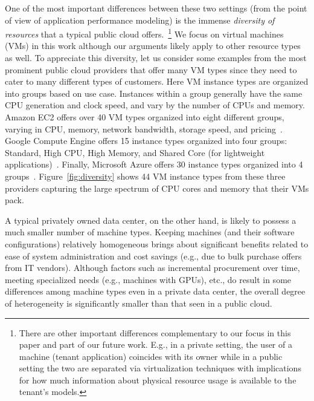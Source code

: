 One of the most important differences between  these two settings (from the point of view of application performance modeling) is the immense {\it diversity of resources} that a typical public cloud offers.~\footnote{There are other important differences complementary to our focus in this paper and part of our future work. E.g., in a private setting, the user of a machine (tenant application) coincides with its owner while in a public setting the two are separated via virtualization techniques with implications for how much information about physical resource usage is available to the tenant's models. } We focus on virtual machines (VMs) %
in this work although our arguments likely apply to other resource types as well. To appreciate this diversity, let us consider some examples from the most prominent public cloud providers that offer many VM types since they need to cater to many different types of customers. Here VM instance types are organized into groups based on use case.  Instances within a group generally have the same CPU generation and clock speed, and vary by the number of CPUs and memory.  Amazon EC2 offers over 40 VM types organized into eight different groups, varying in CPU, memory, network bandwidth, storage speed, and pricing~\cite{amazon-ec2}. Google Compute Engine offers 15 instance types organized into four groups: Standard, High CPU, High Memory, and Shared Core (for lightweight applications)~\cite{google-computeengine}. Finally, Microsoft Azure offers 30 instance types organized into 4 groups~\cite{windows-azure}. Figure~\ref{fig:diversity} shows 44 VM instance types from these three providers capturing the large spectrum of CPU cores and memory that their VMs pack. %

A typical privately owned data center, on the other hand, is likely to possess a much smaller number of machine types. Keeping machines (and their software configurations) relatively homogeneous brings about significant benefits related to ease of system administration and cost savings (e.g., due to bulk purchase offers from IT vendors). Although factors such as incremental procurement over time, meeting specialized needs (e.g., machines with GPUs), etc.,  do result in some differences among machine types even in a private data center, the overall degree of heterogeneity is significantly smaller than that seen in a  public cloud.

